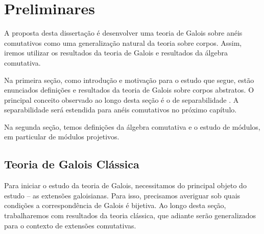\chapter{Preliminares}
A proposta desta dissertação é desenvolver uma teoria de Galois sobre anéis comutativos como uma generalização natural da teoria sobre corpos. Assim, iremos utilizar os resultados da teoria de Galois e resultados da álgebra comutativa. \par
Na primeira seção, como introdução e motivação para o estudo que segue, estão enunciados definições e resultados da teoria de Galois sobre corpos abstratos. O principal conceito observado ao longo desta seção é o de separabilidade \cite{stewart}. A separabilidade será estendida para anéis comutativos no próximo capítulo. \par 
Na segunda seção, temos definições da álgebra comutativa e o estudo de módulos, em particular de módulos projetivos. \par

\section{Teoria de Galois Clássica}
Para iniciar o estudo da teoria de Galois, necessitamos do principal objeto do estudo -- as extensões galoisianas. Para isso, precisamos averiguar sob quais condições a correspondência de Galois é bijetiva. Ao longo desta seção, trabalharemos com resultados da teoria clássica, que adiante serão generalizados para o contexto de extensões comutativas.

